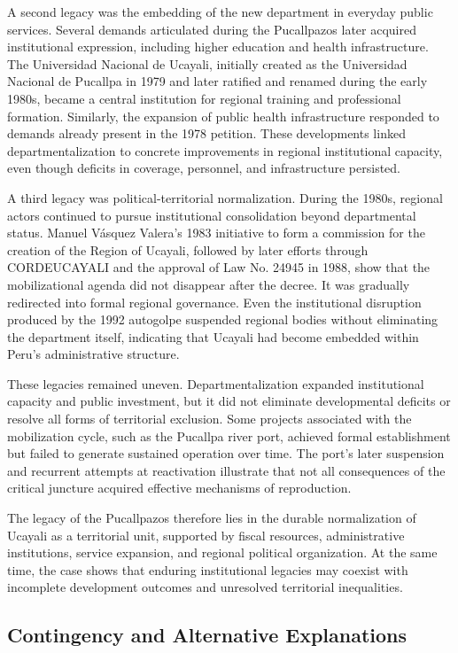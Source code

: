 \documentclass[12pt]{article}
\begin{document}
A second legacy was the embedding of the new department in everyday public services. Several demands articulated during the Pucallpazos later acquired institutional expression, including higher education and health infrastructure. The Universidad Nacional de Ucayali, initially created as the Universidad Nacional de Pucallpa in 1979 and later ratified and renamed during the early 1980s, became a central institution for regional training and professional formation. Similarly, the expansion of public health infrastructure responded to demands already present in the 1978 petition. These developments linked departmentalization to concrete improvements in regional institutional capacity, even though deficits in coverage, personnel, and infrastructure persisted.

A third legacy was political-territorial normalization. During the 1980s, regional actors continued to pursue institutional consolidation beyond departmental status. Manuel Vásquez Valera’s 1983 initiative to form a commission for the creation of the Region of Ucayali, followed by later efforts through CORDEUCAYALI and the approval of Law No. 24945 in 1988, show that the mobilizational agenda did not disappear after the decree. It was gradually redirected into formal regional governance. Even the institutional disruption produced by the 1992 autogolpe suspended regional bodies without eliminating the department itself, indicating that Ucayali had become embedded within Peru’s administrative structure.

These legacies remained uneven. Departmentalization expanded institutional capacity and public investment, but it did not eliminate developmental deficits or resolve all forms of territorial exclusion. Some projects associated with the mobilization cycle, such as the Pucallpa river port, achieved formal establishment but failed to generate sustained operation over time. The port’s later suspension and recurrent attempts at reactivation illustrate that not all consequences of the critical juncture acquired effective mechanisms of reproduction.

The legacy of the Pucallpazos therefore lies in the durable normalization of Ucayali as a territorial unit, supported by fiscal resources, administrative institutions, service expansion, and regional political organization. At the same time, the case shows that enduring institutional legacies may coexist with incomplete development outcomes and unresolved territorial inequalities.

\subsection{Contingency and Alternative Explanations}\label{counterfactual}
\end{document}

